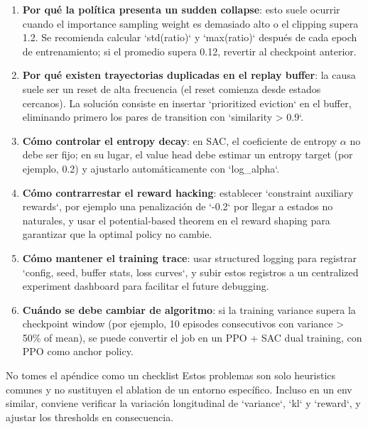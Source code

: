\documentclass[a4paper]{article}
\begin{document}
\begin{enumerate}
    \item \textbf{Por qué la política presenta un sudden collapse}: esto suele ocurrir cuando el importance sampling weight es demasiado alto o el clipping supera 1.2. Se recomienda calcular `std(ratio)` y `max(ratio)` después de cada epoch de entrenamiento; si el promedio supera 0.12, revertir al checkpoint anterior.
    \item \textbf{Por qué existen trayectorias duplicadas en el replay buffer}: la causa suele ser un reset de alta frecuencia (el reset comienza desde estados cercanos). La solución consiste en insertar `prioritized eviction` en el buffer, eliminando primero los pares de transition con `similarity > 0.9`.
    \item \textbf{Cómo controlar el entropy decay}: en SAC, el coeficiente de entropy $\alpha$ no debe ser fijo; en su lugar, el value head debe estimar un entropy target (por ejemplo, 0.2) y ajustarlo automáticamente con `log_alpha`.
    \item \textbf{Cómo contrarrestar el reward hacking}: establecer `constraint auxiliary rewards`, por ejemplo una penalización de `-0.2` por llegar a estados no naturales, y usar el potential-based theorem en el reward shaping para garantizar que la optimal policy no cambie.
    \item \textbf{Cómo mantener el training trace}: usar structured logging para registrar `config, seed, buffer stats, loss curves`, y subir estos registros a un centralized experiment dashboard para facilitar el future debugging.
    \item \textbf{Cuándo se debe cambiar de algoritmo}: si la training variance supera la checkpoint window (por ejemplo, 10 episodes consecutivos con variance > 50\% of mean), se puede convertir el job en un PPO + SAC dual training, con PPO como anchor policy.
\end{enumerate}

\begin{warningbox}{No tomes el apéndice como un checklist}
Estos problemas son solo heuristics comunes y no sustituyen el ablation de un entorno específico. Incluso en un env similar, conviene verificar la variación longitudinal de `variance`, `kl` y `reward`, y ajustar los thresholds en consecuencia.
\end{warningbox}
\end{document}
